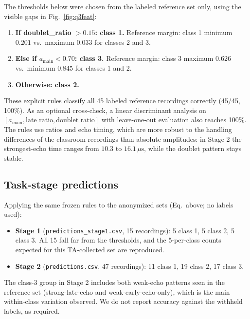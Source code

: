 \documentclass[11pt]{article}
\newcommand{\us}{\ensuremath{\,\mu\mathrm{s}}}
\begin{document}
The thresholds below were chosen from the labeled reference set only, using
the visible gaps in Fig.~\ref{fig:q3feat}:

\begin{enumerate}[leftmargin=1.4em]
  \item \textbf{If doublet\_ratio $>0.15$: class 1.}
  Reference margin: class 1 minimum $0.201$ vs.\ maximum $0.033$ for classes
  2 and 3.
  \item \textbf{Else if $a_{\text{main}}<0.70$: class 3.}
  Reference margin: class 3 maximum $0.626$ vs.\ minimum $0.845$ for classes
  1 and 2.
  \item \textbf{Otherwise: class 2.}
\end{enumerate}

These explicit rules classify all 45 labeled reference recordings correctly
(45/45, 100\%). As an optional cross-check, a linear discriminant analysis on
$[a_{\text{main}},\text{late\_ratio},\text{doublet\_ratio}]$ with
leave-one-out evaluation also reaches 100\%. The rules use ratios and echo
timing, which are more robust to the handling differences of the classroom
recordings than absolute amplitudes: in Stage 2 the strongest-echo time ranges
from $10.3$ to $16.1\us$, while the doublet pattern stays stable.

\subsection*{Task-stage predictions}

Applying the same frozen rules to the anonymized sets (Eq.~above; no labels
used):

\begin{itemize}[leftmargin=1.4em]
  \item \textbf{Stage 1} (\texttt{predictions\_stage1.csv}, 15 recordings):
  5 class 1, 5 class 2, 5 class 3. All 15 fall far from the thresholds, and
  the 5-per-class counts expected for this TA-collected set are reproduced.
  \item \textbf{Stage 2} (\texttt{predictions.csv}, 47 recordings):
  11 class 1, 19 class 2, 17 class 3.
\end{itemize}

The class-3 group in Stage 2 includes both weak-echo patterns seen in the
reference set (strong-late-echo and weak-early-echo-only), which is the main
within-class variation observed. We do not report accuracy against the
withheld labels, as required.
\end{document}
